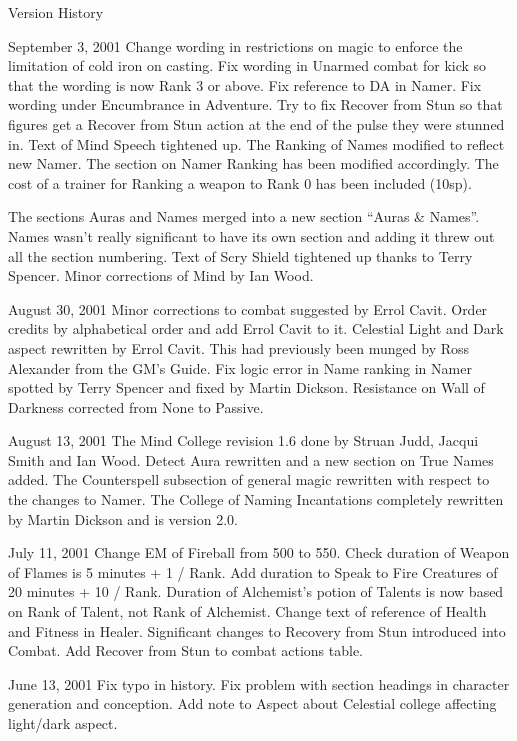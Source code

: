 \begin{Chapter}{Version History}
\begin{Description}
\item[September 3, 2001] Change wording in restrictions on magic to
  enforce the limitation of cold iron on casting.  Fix wording in
  Unarmed combat for kick so that the wording is now Rank 3 or above.
  Fix reference to DA in Namer.  Fix wording under Encumbrance in
  Adventure.  Try to fix Recover from Stun so that figures get a
  Recover from Stun action at the end of the pulse they were stunned
  in.  Text of Mind Speech tightened up. The Ranking of Names modified
  to reflect new Namer. The section on Namer Ranking has been modified
  accordingly.  The cost of a trainer for Ranking a weapon to Rank 0
  has been included (10sp).

  The sections Auras and Names merged into a new section “Auras \&
  Names”.  Names wasn’t really significant to have its own section and
  adding it threw out all the section numbering.  Text of Scry Shield
  tightened up thanks to Terry Spencer. Minor corrections of Mind by
  Ian Wood.

\item[August 30, 2001] Minor corrections to combat suggested by Errol
  Cavit.  Order credits by alphabetical order and add Errol Cavit to
  it.  Celestial Light and Dark aspect rewritten by Errol Cavit.  This
  had previously been munged by Ross Alexander from the GM’s Guide.
  Fix logic error in Name ranking in Namer spotted by Terry Spencer
  and fixed by Martin Dickson.  Resistance on Wall of Darkness
  corrected from None to Passive.

\item[August 13, 2001] The Mind College revision 1.6 done by Struan
  Judd, Jacqui Smith and Ian Wood.  Detect Aura rewritten and a new
  section on True Names added.  The Counterspell subsection of general
  magic rewritten with respect to the changes to Namer.  The College
  of Naming Incantations completely rewritten by Martin Dickson and is
  version 2.0.

\item[July 11, 2001] Change EM of Fireball from 500 to 550.  Check
  duration of Weapon of Flames is 5 minutes + 1 / Rank. Add duration
  to Speak to Fire Creatures of 20 minutes + 10 / Rank.  Duration of
  Alchemist’s potion of Talents is now based on Rank of Talent, not
  Rank of Alchemist.  Change text of reference of Health and Fitness
  in Healer.  Significant changes to Recovery from Stun introduced
  into Combat.  Add Recover from Stun to combat actions table.

\item[June 13, 2001] Fix typo in history.  Fix problem with section
  headings in character generation and conception.  Add note to Aspect
  about Celestial college affecting light/dark aspect.


\end{Description}
\end{Chapter}
